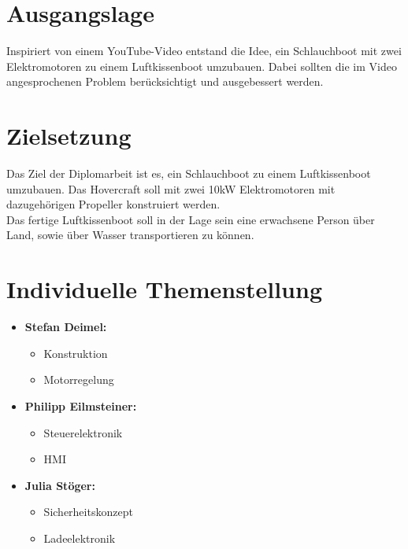\section{Ausgangslage}
Inspiriert von einem YouTube-Video\textsuperscript{\cite{YoutubeVideo}} entstand die Idee, ein Schlauchboot mit zwei Elektromotoren zu einem Luftkissenboot umzubauen. Dabei sollten die im Video angesprochenen Problem berücksichtigt und ausgebessert werden.

\section{Zielsetzung}
Das Ziel der Diplomarbeit ist es, ein Schlauchboot zu einem Luftkissenboot umzubauen. Das Hovercraft soll mit zwei 10kW Elektromotoren mit dazugehörigen Propeller konstruiert werden.\\
Das fertige Luftkissenboot soll in der Lage sein eine erwachsene Person über Land, sowie über Wasser transportieren zu können.


\section{Individuelle Themenstellung}
\begin{itemize}
    \item \textbf{Stefan Deimel:}
    \begin{itemize}
      \item Konstruktion
      \item Motorregelung
    \end{itemize}
    \item \textbf{Philipp Eilmsteiner:}
    \begin{itemize}
      \item Steuerelektronik
      \item HMI
    \end{itemize}
    \item \textbf{Julia Stöger:}
    \begin{itemize}
      \item Sicherheitskonzept
      \item Ladeelektronik
    \end{itemize}
\end{itemize}



